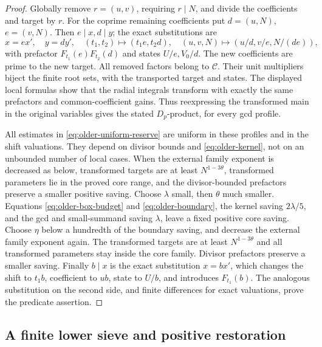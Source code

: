 \begin{proof}
Globally remove \(r=(u,v)\), requiring \(r\mid N\), and divide
the coefficients and target by \(r\).
For the coprime remaining coefficients put \(d=(u,N)\), \(e=(v,N)\).
Then \(e\mid x,d\mid y\); the exact substitutions are
\[
 x=ex',\quad y=dy',\quad
 (t_1,t_2)\mapsto(t_1e,t_2d),\quad
 (u,v,N)\mapsto(u/d,v/e,N/(de)),
\]
with prefactor \(F_{t_1}(e)F_{t_2}(d)\) and states
\(U/e,V_0/d\).  The new coefficients are prime to the new target.
All removed factors belong to \(\mathcal C\).
Their unit multipliers biject the finite root sets, with the
transported target and states.  The displayed local formulas show
that the radial integrals transform with exactly the same
prefactors and common-coefficient gains.
Thus reexpressing the transformed main in the original variables
gives the stated \(D_p\)-product, for every gcd profile.

All estimates in \eqref{eq:older-uniform-reserve} are uniform in
these profiles and in the shift valuations.  They depend on
divisor bounds and \eqref{eq:older-kernel}, not on an unbounded
number of local cases.  When the external family exponent is
decreased as below, transformed targets are at least
\(N^{1-3\theta}\), transformed parameters lie in the proved core
range, and the divisor-bounded prefactors preserve a smaller
positive saving.
Choose \(\lambda\) small, then \(\theta\) much smaller.
Equations \eqref{eq:older-box-budget} and
\eqref{eq:older-boundary}, the kernel saving \(2\lambda/5\),
and the gcd and small-summand saving \(\lambda\), leave a fixed
positive core saving.  Choose \(\eta\) below a hundredth of the
boundary saving, and decrease the external family exponent again.
The transformed targets are at least \(N^{1-3\theta}\) and all
transformed parameters stay inside the core family.
Divisor prefactors preserve a smaller saving.
Finally \(b\mid x\) is the exact substitution \(x=bx'\), which
changes the shift to \(t_1b\), coefficient to \(ub\), state to
\(U/b\), and introduces \(F_{t_1}(b)\).
The analogous substitution on the second side, and finite differences
for exact valuations, prove the predicate assertion.
\end{proof}

\subsection{A finite lower sieve and positive restoration}

